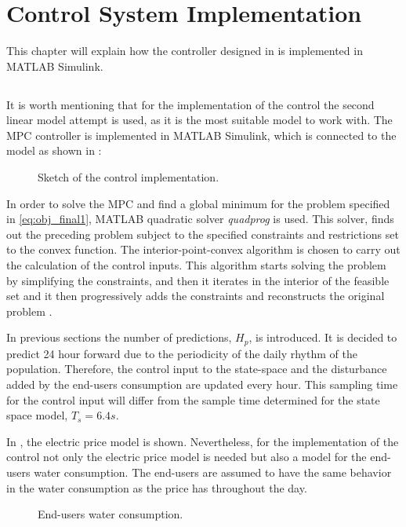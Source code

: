 \chapter{Control System Implementation}
\label{implementation_of_controller}

This chapter will explain how the controller designed in  is implemented in MATLAB Simulink.  

\section{}
It is worth mentioning that for the implementation of the control the second linear model attempt is used, as it is the most suitable model to work with. The MPC controller is implemented in MATLAB Simulink, which is connected to the model as shown in :

\begin{figure}[H]
\centering
 
\caption{Sketch of the control implementation.}
\label{fig:control_sketch}
\end{figure}

In order to solve the MPC and find a global minimum for the problem specified in \eqref{eq:obj_final1},  MATLAB quadratic solver \textit{quadprog} is used. This solver, finds out the preceding problem subject to the specified constraints and restrictions set to the convex function. The interior-point-convex algorithm is chosen to carry out the calculation of the control inputs. This algorithm starts solving the problem by simplifying the constraints, and then it iterates in the interior of the feasible set and it then progressively adds the constraints and reconstructs the original problem \cite{Convex_optimization}. 


In previous sections the number of predictions, $H_p$, is introduced. It is decided to predict 24 hour forward due to the periodicity of the daily rhythm of the population. Therefore, the control input to the state-space and the disturbance added by the end-users consumption are updated every hour. This sampling time for the control input will differ from the sample time determined for the state space model, $T_s = 6.4s$. 

In , the electric price model is shown. Nevertheless, for the implementation of the control not only the electric price model is needed but also a model for the end-users water consumption. The end-users are assumed to have the same behavior in the water consumption as the price has throughout the day.

\begin{figure}[H]
\centering
 
\caption{End-users water consumption.}
\label{fig:water_consumption}
\end{figure}

